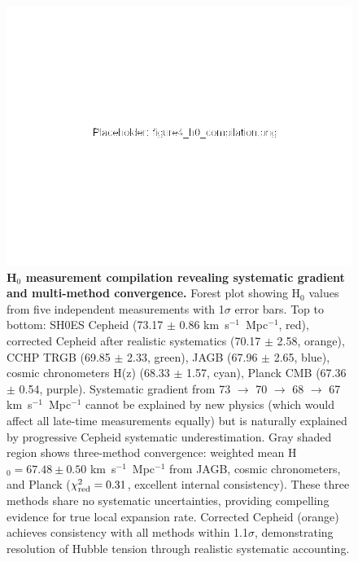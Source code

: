 \documentclass[twocolumn, linenumbers]{aastex701}
\begin{document}
\begin{figure}
\includegraphics[width=\columnwidth]{../figures/figure4_h0_compilation.png}
\caption{\textbf{H$_0$ measurement compilation revealing systematic gradient and multi-method convergence.} Forest plot showing H$_0$ values from five independent measurements with 1$\sigma$ error bars. Top to bottom: SH0ES Cepheid (73.17 $\pm$ 0.86 km~s$^{-1}$~Mpc$^{-1}$, red), corrected Cepheid after realistic systematics (70.17 $\pm$ 2.58, orange), CCHP TRGB (69.85 $\pm$ 2.33, green), JAGB (67.96 $\pm$ 2.65, blue), cosmic chronometers H(z) (68.33 $\pm$ 1.57, cyan), Planck CMB (67.36 $\pm$ 0.54, purple). Systematic gradient from 73 $\rightarrow$ 70 $\rightarrow$ 68 $\rightarrow$ 67 km~s$^{-1}$~Mpc$^{-1}$ cannot be explained by new physics (which would affect all late-time measurements equally) but is naturally explained by progressive Cepheid systematic underestimation. Gray shaded region shows three-method convergence: weighted mean H$_0 = 67.48 \pm 0.50$ km~s$^{-1}$~Mpc$^{-1}$ from JAGB, cosmic chronometers, and Planck ($\chi^2_{\rm red} = 0.31$, excellent internal consistency). These three methods share no systematic uncertainties, providing compelling evidence for true local expansion rate. Corrected Cepheid (orange) achieves consistency with all methods within 1.1$\sigma$, demonstrating resolution of Hubble tension through realistic systematic accounting.}
\label{fig:h0_compilation}
\end{figure}
\end{document}
